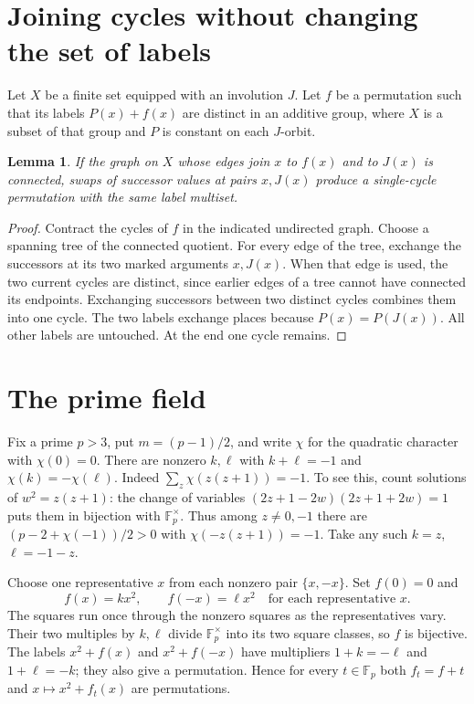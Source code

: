 \documentclass[11pt]{article}
\newtheorem{lemma}[theorem]{Lemma}
\newcommand{\F}{\mathbb F}
\begin{document}
\section{Joining cycles without changing the set of labels}
Let $X$ be a finite set equipped with an involution $J$. Let $f$ be a permutation such that its labels $P(x)+f(x)$ are distinct in an additive group, where $X$ is a subset of that group and $P$ is constant on each $J$-orbit.
\begin{lemma}\label{lem:splice}
If the graph on $X$ whose edges join $x$ to $f(x)$ and to $J(x)$ is connected, swaps of successor values at pairs $x,J(x)$ produce a single-cycle permutation with the same label multiset.
\end{lemma}
\begin{proof}
Contract the cycles of $f$ in the indicated undirected graph. Choose a spanning tree of the connected quotient. For every edge of the tree, exchange the successors at its two marked arguments $x,J(x)$. When that edge is used, the two current cycles are distinct, since earlier edges of a tree cannot have connected its endpoints. Exchanging successors between two distinct cycles combines them into one cycle. The two labels exchange places because $P(x)=P(J(x))$. All other labels are untouched. At the end one cycle remains.
\end{proof}

\section{The prime field}
Fix a prime $p>3$, put $m=(p-1)/2$, and write $\chi$ for the quadratic character with $\chi(0)=0$. There are nonzero $k,\ell$ with $k+\ell=-1$ and $\chi(k)=-\chi(\ell)$. Indeed $\sum_z\chi(z(z+1))=-1$. To see this, count solutions of $w^2=z(z+1)$: the change of variables $(2z+1-2w)(2z+1+2w)=1$ puts them in bijection with $\F_p^\times$. Thus among $z\ne0,-1$ there are $(p-2+\chi(-1))/2>0$ with $\chi(-z(z+1))=-1$. Take any such $k=z$, $\ell=-1-z$.

Choose one representative $x$ from each nonzero pair $\{x,-x\}$. Set $f(0)=0$ and
\[
 f(x)=kx^2,\qquad f(-x)=\ell x^2\quad\text{for each representative }x.
\]
The squares run once through the nonzero squares as the representatives vary. Their two multiples by $k,\ell$ divide $\F_p^\times$ into its two square classes, so $f$ is bijective. The labels $x^2+f(x)$ and $x^2+f(-x)$ have multipliers $1+k=-\ell$ and $1+\ell=-k$; they also give a permutation. Hence for every $t\in\F_p$ both $f_t=f+t$ and $x\mapsto x^2+f_t(x)$ are permutations.
\end{document}
